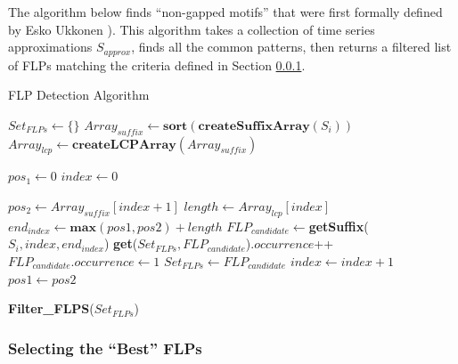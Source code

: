 The algorithm below finds ``non-gapped motifs'' that were first formally defined by Esko Ukkonen \cite{ukkonen2007structural}).
This algorithm takes a collection of time series approximations $S_{approx}$, finds all the common patterns, then returns a filtered list of FLPs matching the criteria defined in Section \ref{sec:bestFLP}.

\begin{algorithm}
\caption{FLP Detection Algorithm}
\begin{algorithmic}[1]
	\State $Set_{FLPs} \gets \{\}$
		\State $Array_{suffix} \gets \textbf{sort}(\textbf{createSuffixArray} (S_{i} ) )$
		\State $Array_{lcp} \gets \textbf{createLCPArray}(Array_{suffix})$
	
		\State $pos_1 \gets 0$
		\State $index \gets 0$	
	
			\State $pos_2 \gets Array_{suffix}[index+1]$			
			\State $length \gets Array_{lcp}[index]$		
			\State $end_{index} \gets \textbf{max}(pos1, pos2) + length$			
			\State $FLP_{candidate} \gets $\textbf{getSuffix}($S_{i}, index, end_{index}$)			
			\State \textbf{get}($Set_{FLPs},FLP_{candidate}$)$.occurrence$++			
		\Else
			\State $FLP_{candidate}.occurrence \gets 1$
			\State $Set_{FLPs} \gets FLP_{candidate}$
		\EndIf
			\State $index \gets index+1$
			\State $pos1 \gets pos2$
		\EndWhile
	\EndFor
 	
	\Return \textbf{Filter\_FLPS}($Set_{FLPs}$) 

\EndFunction
\end{algorithmic}
\label{alg:FLP}
\end{algorithm}

\subsubsection{Selecting the ``Best'' FLPs}
\label{sec:bestFLP}

